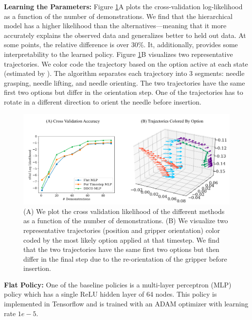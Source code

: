 \vspace{0.25em} \noindent \textbf{Learning the Parameters: } Figure \ref{fig:dvrkexp1}A plots the cross-validation log-likelihood as a function of the number of demonstrations.
We find that the hierarchical model has a higher likelihood than the alternatives---meaning that it more accurately explains the observed data and generalizes better to held out data.
At some points, the relative difference is over 30\%.
It, additionally, provides some interpretability to the learned policy.
Figure \ref{fig:dvrkexp1}B visualizes two representative trajectories.
We color code the trajectory based on the option active at each state (estimated by \alg).
The algorithm separates each trajectory into 3 segments: needle grasping, needle lifting, and needle orienting.
The two trajectories have the same first two options but differ in the orientation step.
One of the trajectories has to rotate in a different direction to orient the needle before insertion.

\begin{figure}[ht!]
    \centering
    \includegraphics[width=\textwidth]{ddco-experiments/exp-5-1-1.png}
    \caption{(A) We plot the cross validation likelihood of the different methods as a function of the number of demonstrations. (B) We visualize two representative trajectories (position and gripper orientation) color coded by the most likely option applied at that timestep. We find that the two trajectories have the same first two options but then differ in the final step due to the re-orientation of the gripper before insertion.  \label{fig:dvrkexp1}}
\end{figure}


\vspace{0.25em} \noindent \textbf{Flat Policy: } One of the baseline policies is a multi-layer perceptron (MLP) policy which has a single ReLU hidden layer of 64 nodes.
This policy is implemented in Tensorflow and is trained with an ADAM optimizer with learning rate $1e-5$.

